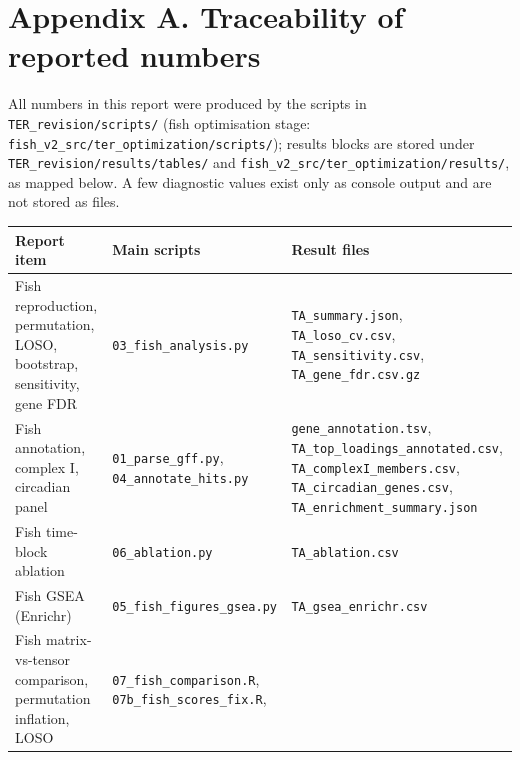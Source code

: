 \documentclass[
]{article}
\newcounter{none} %
\begin{document}
\section{Appendix A. Traceability of reported
numbers}\label{appendix-a.-traceability-of-reported-numbers}

All numbers in this report were produced by the scripts in
\texttt{TER\_revision/scripts/} (fish optimisation stage:
\texttt{fish\_v2\_src/ter\_optimization/scripts/}); results blocks are
stored under \texttt{TER\_revision/results/tables/} and
\texttt{fish\_v2\_src/ter\_optimization/results/}, as mapped below. A
few diagnostic values exist only as console output and are not stored as
files.

{\def\LTcaptype{none} %
\begin{longtable}[]{@{}
  >{\raggedright\arraybackslash}p{}
  >{\raggedright\arraybackslash}p{}
  >{\raggedright\arraybackslash}p{}@{}}
\toprule\noalign{}
\begin{minipage}[b]{\linewidth}\raggedright
Report item
\end{minipage} & \begin{minipage}[b]{\linewidth}\raggedright
Main scripts
\end{minipage} & \begin{minipage}[b]{\linewidth}\raggedright
Result files
\end{minipage} \\
\midrule\noalign{}
\endhead
\bottomrule\noalign{}
\endlastfoot
Fish reproduction, permutation, LOSO, bootstrap, sensitivity, gene FDR &
\texttt{03\_fish\_analysis.py} & \texttt{TA\_summary.json},
\texttt{TA\_loso\_cv.csv}, \texttt{TA\_sensitivity.csv},
\texttt{TA\_gene\_fdr.csv.gz} \\
Fish annotation, complex I, circadian panel &
\texttt{01\_parse\_gff.py}, \texttt{04\_annotate\_hits.py} &
\texttt{gene\_annotation.tsv},
\texttt{TA\_top\_loadings\_annotated.csv},
\texttt{TA\_complexI\_members.csv}, \texttt{TA\_circadian\_genes.csv},
\texttt{TA\_enrichment\_summary.json} \\
Fish time-block ablation & \texttt{06\_ablation.py} &
\texttt{TA\_ablation.csv} \\
Fish GSEA (Enrichr) & \texttt{05\_fish\_figures\_gsea.py} &
\texttt{TA\_gsea\_enrichr.csv} \\
Fish matrix-vs-tensor comparison, permutation inflation, LOSO &
\texttt{07\_fish\_comparison.R}, \texttt{07b\_fish\_scores\_fix.R},

\end{longtable}}
\end{document}
